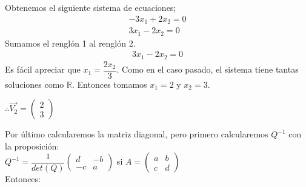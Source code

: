 \documentclass[letterpaper]{article}
\renewcommand{\*}{\cdot}
\theoremstyle{definition}
\begin{document}
	Obtenemos el siguiente sistema de ecuaciones;
	\begin{align*}
	-3x_{1}+2x_{2}= 0\\
	3x_{1}-2x_{2}=0
	\end{align*}
	Sumamos el renglón 1 al renglón 2.
	\begin{align*}
	3x_{1}-2x_{2}= 0
	\end{align*}
	Es fácil apreciar que $x_{1}= \dfrac{2x_{2}}{3}$. Como en el caso pasado, el sistema tiene tantas soluciones como $\mathbb{R}$. Entonces tomamos $x_{1}=2$ y $x_{2}=3$.
	\begin{center}
		$\therefore \vec{V_{2}} = \begin{pmatrix}	2 \\ 3	\end{pmatrix}$
	\end{center}
	Por último calcularemos la matriz diagonal, pero primero calcularemos $Q^{-1}$ con la proposición:\\
	$Q^{-1}=\dfrac{1}{det(Q)} \begin{pmatrix}	d & -b \\ -c & a \end{pmatrix}$     si  $A = \begin{pmatrix} 	a & b \\ c & d \end{pmatrix}$\\
	Entonces:\\
	
\end{document}

